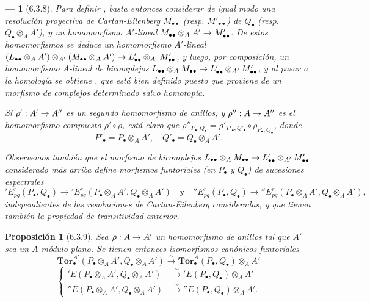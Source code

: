 \documentclass[10pt,oneside,openany]{book}
\theoremstyle{egaenv}\newtheorem*{env}{---}
\theoremstyle{egastatement}
\newtheorem*{proposition}{Proposición}
\theoremstyle{egadescription}
\renewcommand{\to}{\mathchoice{\longrightarrow}{\rightarrow}{\rightarrow}{\rightarrow}}
\begin{document}
\begin{env}[6.3.8]
Para definir , basta entonces considerar de igual modo una
resolución proyectiva de Cartan-Eilenberg $M_{\bullet\bullet}$ (resp.
$M'_{\bullet\bullet}$) de $Q_\bullet$ (resp.
$Q_\bullet\otimes_A A'$), y un homomorfismo $A'$-lineal
$M_{\bullet\bullet}\otimes_A A'\to M'_{\bullet\bullet}$. De estos
homomorfismos se deduce un homomorfismo $A'$-lineal
$(L_{\bullet\bullet}\otimes_A A')\otimes_{A'}
(M_{\bullet\bullet}\otimes_A A')
\to
L'_{\bullet\bullet}\otimes_{A'}M'_{\bullet\bullet}$,
y luego, por composición, un homomorfismo $A$-lineal de bicomplejos
$L_{\bullet\bullet}\otimes_A M_{\bullet\bullet}
\to
L'_{\bullet\bullet}\otimes_{A'}M'_{\bullet\bullet}$,
y al pasar a la homología se obtiene , que está bien
definido
puesto que proviene de un morfismo de complejos determinado salvo homotopía.

Si $\rho':A'\to A''$ es un segundo homomorfismo de anillos, y
$\rho'':A\to A''$ es el homomorfismo compuesto $\rho'\circ\rho$, está claro que
$\rho''_{P_\bullet,Q_\bullet}
=\rho'_{P'_\bullet,Q'_\bullet}\circ\rho_{P_\bullet,Q_\bullet}$, donde
\[
  P'_\bullet=P_\bullet\otimes_A A',
  \quad Q'_\bullet=Q_\bullet\otimes_A A'.
\]

Observemos también que el morfismo de bicomplejos
$L_{\bullet\bullet}\otimes_A M_{\bullet\bullet}
\to L'_{\bullet\bullet}\otimes_{A'}M'_{\bullet\bullet}$ considerado
más arriba define morfismos funtoriales (en $P_\bullet$ y $Q_\bullet$)
de sucesiones espectrales
\[
  'E_{pq}^r(P_\bullet,Q_\bullet)
  \longrightarrow
  'E_{pq}^r(P_\bullet\otimes_A A',Q_\bullet\otimes_A A')
  \quad\text{y}\quad
  ''E_{pq}^r(P_\bullet,Q_\bullet)
  \longrightarrow
  ''E_{pq}^r(P_\bullet\otimes_A A',Q_\bullet\otimes_A A'),
\]
independientes de las resoluciones de Cartan-Eilenberg consideradas, y que tienen también
la propiedad de transitividad anterior.
\end{env}

\begin{proposition}[6.3.9]
\label{III.6.3.9}
Sea $\rho:A\to A'$ un homomorfismo de anillos tal que $A'$ sea un
$A$-módulo \textup{plano}. Se tienen entonces isomorfismos canónicos funtoriales
\[
  \mathbf{Tor}_\bullet^{A'}
  (P_\bullet\otimes_A A',Q_\bullet\otimes_A A')
  \xrightarrow{\sim}
  \mathbf{Tor}_\bullet^A(P_\bullet,Q_\bullet)\otimes_A A'
  \tag{6.3.9.1}\label{III.6.3.9.1.fr}
\]
\[
  \left\{
  \begin{aligned}
  'E(P_\bullet\otimes_A A',Q_\bullet\otimes_A A')
    &\xrightarrow{\sim}'E(P_\bullet,Q_\bullet)\otimes_A A'\\
  ''E(P_\bullet\otimes_A A',Q_\bullet\otimes_A A')
    &\xrightarrow{\sim}''E(P_\bullet,Q_\bullet)\otimes_A A'.
  \end{aligned}
  \right.
  \tag{6.3.9.2}\label{III.6.3.9.2.fr}
\]
\end{proposition}
\end{document}

